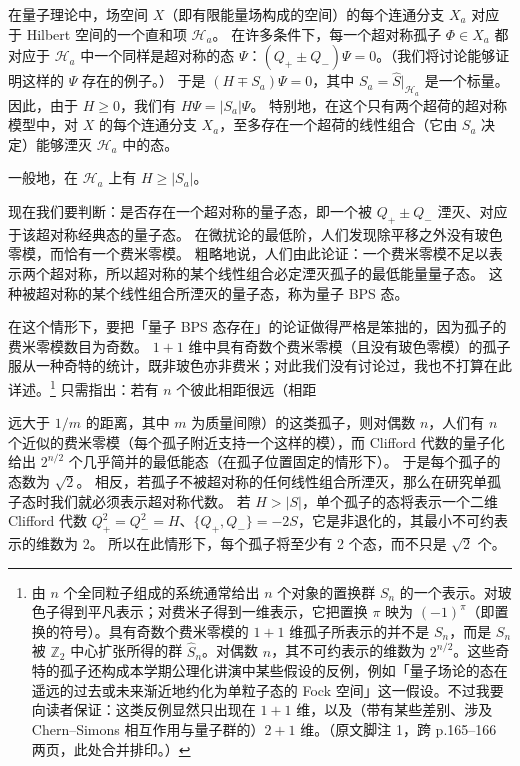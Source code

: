 在量子理论中，场空间 $X$（即有限能量场构成的空间）的每个连通分支 $X_a$ 对应于 Hilbert 空间的一个直和项 $\mathcal{H}_a$。
在许多条件下，每一个超对称孤子 $\Phi\in X_a$ 都对应于 $\mathcal{H}_a$ 中一个同样是超对称的态 $\Psi$：$(Q_+\pm Q_-)\Psi=0$。（我们将讨论能够证明这样的 $\Psi$ 存在的例子。）
于是 $(H\mp S_a)\Psi=0$，其中 $S_a=\hat S|_{\mathcal{H}_a}$ 是一个标量。
因此，由于 $H\ge0$，我们有 $H\Psi=|S_a|\Psi$。
特别地，在这个只有两个超荷的超对称模型中，对 $X$ 的每个连通分支 $X_a$，至多存在一个超荷的线性组合（它由 $S_a$ 决定）能够湮灭 $\mathcal{H}_a$ 中的态。

一般地，在 $\mathcal{H}_a$ 上有 $H\ge|S_a|$。

现在我们要判断：是否存在一个超对称的量子态，即一个被 $Q_+\pm Q_-$ 湮灭、对应于该超对称经典态的量子态。
在微扰论的最低阶，人们发现除平移之外没有玻色零模，而恰有一个费米零模。
粗略地说，人们由此论证：一个费米零模不足以表示两个超对称，所以超对称的某个线性组合必定湮灭孤子的最低能量量子态。
这种被超对称的某个线性组合所湮灭的量子态，称为量子 BPS 态。

在这个情形下，要把「量子 BPS 态存在」的论证做得严格是笨拙的，因为孤子的费米零模数目为奇数。
$1+1$ 维中具有奇数个费米零模（且没有玻色零模）的孤子服从一种奇特的统计，既非玻色亦非费米；对此我们没有讨论过，我也不打算在此详述。\footnote{由 $n$ 个全同粒子组成的系统通常给出 $n$ 个对象的置换群 $S_n$ 的一个表示。对玻色子得到平凡表示；对费米子得到一维表示，它把置换 $\pi$ 映为 $(-1)^{\pi}$（即置换的符号）。具有奇数个费米零模的 $1+1$ 维孤子所表示的并不是 $S_n$，而是 $S_n$ 被 $\mathbb{Z}_2$ 中心扩张所得的群 $\hat S_n$。对偶数 $n$，其不可约表示的维数为 $2^{n/2}$。这些奇特的孤子还构成本学期公理化讲演中某些假设的反例，例如「量子场论的态在遥远的过去或未来渐近地约化为单粒子态的 Fock 空间」这一假设。不过我要向读者保证：这类反例显然只出现在 $1+1$ 维，以及（带有某些差别、涉及 Chern--Simons 相互作用与量子群的）$2+1$ 维。（原文脚注 1，跨 p.165--166 两页，此处合并排印。）}
只需指出：若有 $n$ 个彼此相距很远（相距

远大于 $1/m$ 的距离，其中 $m$ 为质量间隙）的这类孤子，则对偶数 $n$，人们有 $n$ 个近似的费米零模（每个孤子附近支持一个这样的模），而 Clifford 代数的量子化给出 $2^{n/2}$ 个几乎简并的最低能态（在孤子位置固定的情形下）。
于是每个孤子的态数为 $\sqrt2$。
相反，若孤子不被超对称的任何线性组合所湮灭，那么在研究单孤子态时我们就必须表示超对称代数。
若 $H>|S|$，单个孤子的态将表示一个二维 Clifford 代数 $Q_+^2=Q_-^2=H$、$\{Q_+,Q_-\}=-2S$，它是非退化的，其最小不可约表示的维数为 2。
所以在此情形下，每个孤子将至少有 2 个态，而不只是 $\sqrt2$ 个。

